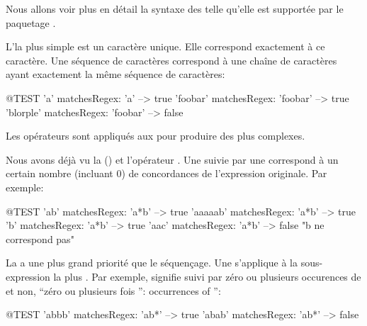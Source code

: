 \documentclass[a4paper,10pt,twoside]{book}
\begin{document}

Nous allons voir plus en détail la syntaxe des \expreg telle qu'elle
est supportée par le paquetage \pkgregex.

L'\expreg la plus simple est un caractère unique. Elle correspond
exactement à ce caractère. Une séquence de caractères correspond à une
chaîne de caractères ayant exactement la même séquence de caractères:
\begin{code}{@TEST}
'a' matchesRegex: 'a'                  --> true
'foobar' matchesRegex: 'foobar'  --> true
'blorple' matchesRegex: 'foobar' --> false
\end{code}

Les opérateurs sont appliqués aux \expregs pour produire des \expregs
plus complexes.

Nous avons déjà vu la \ind{\kleenestar} (\ct{*}) et l'opérateur \ct{+}.
Une \expreg suivie par une \kleenestar correspond à un certain nombre
(incluant $0$) de concordances de l'expression originale. Par exemple:
\begin{code}{@TEST}
'ab' matchesRegex: 'a*b'         --> true
'aaaaab' matchesRegex: 'a*b' --> true
'b' matchesRegex: 'a*b'           --> true
'aac' matchesRegex: 'a*b'	    --> false    "b ne correspond pas"
\end{code}

La \kleenestar a une plus grand priorité que le séquençage. Une
\kleenestar s'applique à la sous-expression la plus 
.
Par exemple,  signifie  suivi par zéro ou plusieurs
occurences de  et non, ``zéro ou plusieurs fois '':
occurrences of '':
\begin{code}{@TEST}
'abbb' matchesRegex: 'ab*' --> true
'abab' matchesRegex: 'ab*' --> false
\end{code}
\end{document}
